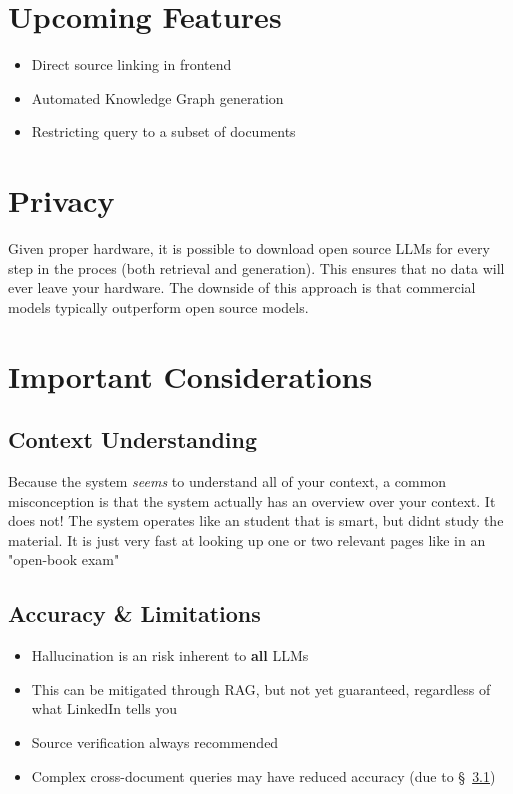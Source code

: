 \documentclass[a4paper,10pt]{article}
\begin{document}
\begin{multicols}{2}
\section{Upcoming Features}
\begin{itemize}
\item Direct source linking in frontend
\item Automated Knowledge Graph generation
\item Restricting query to a subset of documents
\end{itemize}
\section{Privacy}
Given proper hardware, it is possible to download open source LLMs for every step in the proces (both retrieval and generation).
This ensures that no data will ever leave your hardware.
The downside of this approach is that commercial models typically outperform open source models.
\section{Important Considerations}
\subsection{Context Understanding}\label{sec:context}
Because the system \textit{seems} to understand all of your context, a common misconception is that the system actually has an overview over your context. It does not!
The system operates like an student that is smart, but didnt study the material. It is just very fast at looking up one or two relevant pages like in an "open-book exam"
\subsection{Accuracy \& Limitations}
\begin{itemize}
	\item Hallucination is an risk inherent to \textbf{all} LLMs
	\item This can be mitigated through RAG, but not yet guaranteed, regardless of what LinkedIn tells you
	\item Source verification always recommended
	\item Complex cross-document queries may have reduced accuracy (due to \S~\ref{sec:context})
\end{itemize}


\end{multicols}
\end{document}
